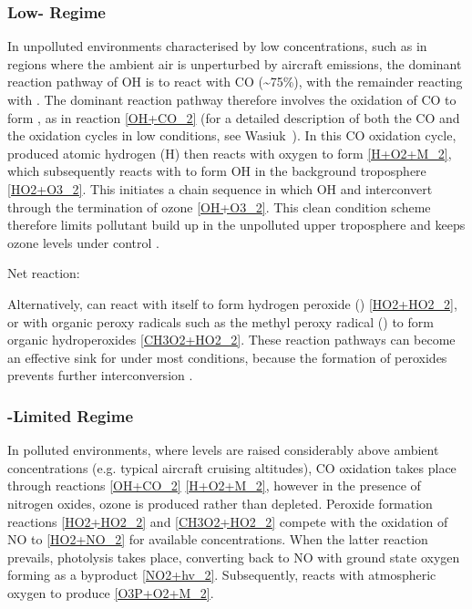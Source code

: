 \subsubsection{Low- Regime}
In unpolluted environments characterised by low  concentrations, such as in regions where the ambient air is unperturbed by aircraft emissions, the dominant reaction pathway of OH is to react with CO (\textasciitilde75\%), with the remainder reacting with  \cite{Thompson1992}. The dominant reaction pathway therefore involves the oxidation of CO to form , as in reaction \eqref{OH+CO_2} (for a detailed description of both the CO and the  oxidation cycles in low  conditions, see Wasiuk\ \cite{Wasiuk2014}). In this CO oxidation cycle, produced atomic hydrogen (H) then reacts with oxygen to form  \eqref{H+O2+M_2}, which subsequently reacts with  to form OH in the background troposphere \eqref{HO2+O3_2}. This initiates a chain sequence in which OH and  interconvert through the termination of ozone \eqref{OH+O3_2}. This clean condition scheme therefore limits pollutant build up in the unpolluted upper troposphere and keeps ozone levels under control \cite{Jacob1999}.





Net reaction: 

Alternatively,  can react with itself to form hydrogen peroxide () \eqref{HO2+HO2_2}, or with organic peroxy radicals such as the methyl peroxy radical () to form organic hydroperoxides \eqref{CH3O2+HO2_2}. These reaction pathways can become an effective sink for  under most conditions, because the formation of peroxides prevents further  interconversion \cite{Gunz1990}.



\subsubsection{-Limited Regime}
In polluted environments, where  levels are raised considerably above ambient concentrations (e.g. typical aircraft cruising altitudes), CO oxidation takes place through reactions \eqref{OH+CO_2} \eqref{H+O2+M_2}, however in the presence of nitrogen oxides, ozone is produced rather than depleted. Peroxide formation reactions \eqref{HO2+HO2_2} and \eqref{CH3O2+HO2_2} compete with the oxidation of NO to  \eqref{HO2+NO_2} for available  concentrations. When the latter reaction prevails,  photolysis takes place, converting back to NO with ground state oxygen  forming as a byproduct \eqref{NO2+hv_2}. Subsequently,  reacts with atmospheric oxygen to produce  \eqref{O3P+O2+M_2}.

